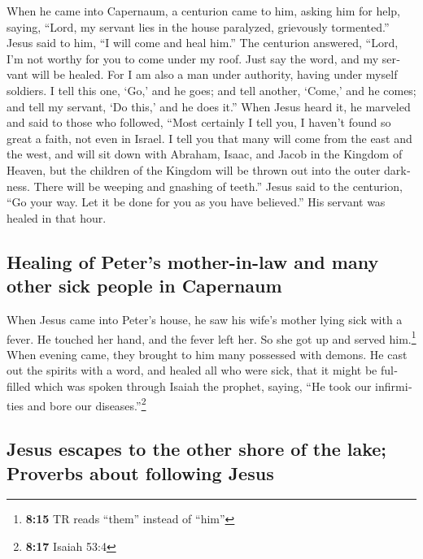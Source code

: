 \begin{paracol}{2}
\begin{otherlanguage}{english}
 When he came into Capernaum, a centurion came to him,
asking him for help,  saying, ``Lord, my servant lies in
the house paralyzed, grievously tormented.''  Jesus said
to him, ``I will come and heal him.''  The centurion
answered, ``Lord, I'm not worthy for you to come under my roof. Just say
the word, and my servant will be healed.  For I am also a
man under authority, having under myself soldiers. I tell this one,
`Go,' and he goes; and tell another, `Come,' and he comes; and tell my
servant, `Do this,' and he does it.''  When Jesus heard
it, he marveled and said to those who followed, ``Most certainly I tell
you, I haven't found so great a faith, not even in Israel.
 I tell you that many will come from the east and the
west, and will sit down with Abraham, Isaac, and Jacob in the Kingdom of
Heaven,  but the children of the Kingdom will be thrown
out into the outer darkness. There will be weeping and gnashing of
teeth.''  Jesus said to the centurion, ``Go your way. Let
it be done for you as you have believed.'' His servant was healed in
that hour.

\hypertarget{healing-of-peters-mother-in-law-and-many-other-sick-people-in-capernaum}{%
\subsection{Healing of Peter's mother-in-law and many other sick people
in
Capernaum}\label{healing-of-peters-mother-in-law-and-many-other-sick-people-in-capernaum}}

 When Jesus came into Peter's house, he saw his wife's
mother lying sick with a fever.  He touched her hand, and
the fever left her. So she got up and served him.\footnote{\textbf{8:15}
  TR reads ``them'' instead of ``him''}  When evening
came, they brought to him many possessed with demons. He cast out the
spirits with a word, and healed all who were sick,  that
it might be fulfilled which was spoken through Isaiah the prophet,
saying, ``He took our infirmities and bore our diseases.''\footnote{\textbf{8:17}
  Isaiah 53:4}

\hypertarget{jesus-escapes-to-the-other-shore-of-the-lake-proverbs-about-following-jesus}{%
\subsection{Jesus escapes to the other shore of the lake; Proverbs about
following
Jesus}\label{jesus-escapes-to-the-other-shore-of-the-lake-proverbs-about-following-jesus}}


\end{otherlanguage}
\end{paracol}
